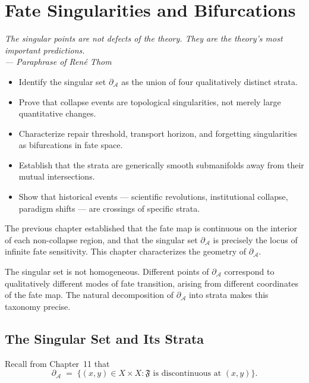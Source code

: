 \documentclass[12pt,twoside,openright]{book}
\newcommand{\distPairs}{X\times X}
\newcommand{\fateMap}{\mathfrak{F}}
\newcommand{\singSet}{\partial_{\!\mathcal{A}}}
\newenvironment{epigraph}[2]{%
  \vspace{1em}\begin{flushright}
  \begin{minipage}{0.72\textwidth}
  \itshape\small #1\\[0.4em]
  \upshape\footnotesize\sffamily\color{DistGray}--- #2
  \end{minipage}\end{flushright}\vspace{1.5em}}{}
\newenvironment{objectives}{%
  \begin{tcolorbox}[colback=DistBlue!5,colframe=DistBlue,
    title={\faCheckCircle\enspace Chapter Objectives},
    fonttitle=\sffamily\bfseries\color{white},
    attach boxed title to top left={yshift=-2mm,xshift=4mm},
    boxed title style={colback=DistBlue},breakable]
  \begin{itemize}[leftmargin=*,nosep]}{%
  \end{itemize}\end{tcolorbox}\vspace{1em}}
\providecommand{\singSet}{\partial_{\!\mathcal{A}}}
\begin{document}
\chapter{Fate Singularities and Bifurcations}
\label{ch:fate-sing}

\begin{epigraph}{The singular points are not defects of the
  theory. They are the theory's most important predictions.}%
  {Paraphrase of Ren\'e Thom}
\end{epigraph}

\begin{objectives}
\item Identify the singular set $\singSet$ as the union of four
  qualitatively distinct strata.
\item Prove that collapse events are topological singularities,
  not merely large quantitative changes.
\item Characterize repair threshold, transport horizon, and
  forgetting singularities as bifurcations in fate space.
\item Establish that the strata are generically smooth
  submanifolds away from their mutual intersections.
\item Show that historical events --- scientific revolutions,
  institutional collapse, paradigm shifts --- are crossings of
  specific strata.
\end{objectives}

The previous chapter established that the fate map is
continuous on the interior of each non-collapse region, and
that the singular set $\singSet$ is precisely the locus of
infinite fate sensitivity. This chapter characterizes the
geometry of $\singSet$.

The singular set is not homogeneous. Different points of
$\singSet$ correspond to qualitatively different modes of fate
transition, arising from different coordinates of the fate map.
The natural decomposition of $\singSet$ into strata makes this
taxonomy precise.

\section{The Singular Set and Its Strata}

Recall from Chapter~11 that
\[
  \singSet
  \;=\;
  \bigl\{(x,y)\in\distPairs
  : \fateMap\text{ is discontinuous at }(x,y)\bigr\}.
\]
\end{document}
